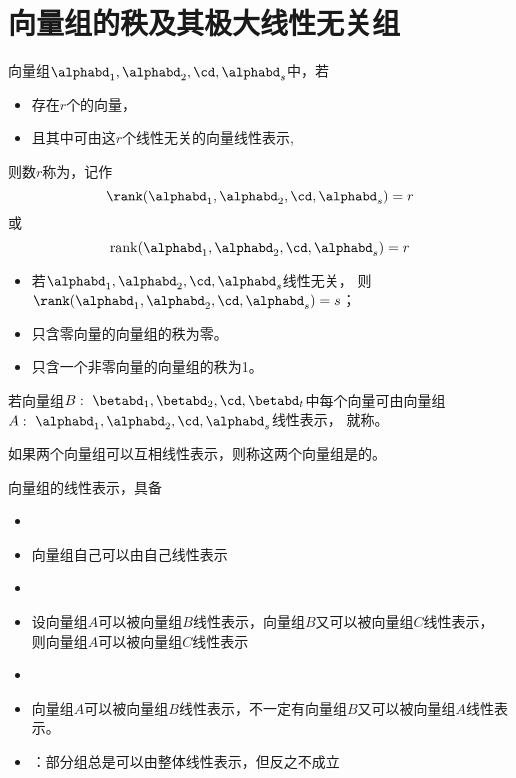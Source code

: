 \section{向量组的秩及其极大线性无关组}

\begin{dingyi}[向量组的秩]
  向量组$\alphabd_1,\alphabd_2,\cd,\alphabd_s$中，若
  \begin{itemize}
  \item 存在$r$个的向量，
  \item 且其中可由这$r$个线性无关的向量线性表示, 
  \end{itemize}
  则数$r$称为，记作
  $$
  \rank(\alphabd_1,\alphabd_2,\cd,\alphabd_s)=r
  $$
  或
  $$
  \mathrm{rank}(\alphabd_1,\alphabd_2,\cd,\alphabd_s)=r
  $$
  
\end{dingyi}

\begin{itemize}
\item 若$\alphabd_1,\alphabd_2,\cd,\alphabd_s$线性无关，
  则$\rank(\alphabd_1,\alphabd_2,\cd,\alphabd_s)=s$；
\item 只含零向量的向量组的秩为零。
\item 只含一个非零向量的向量组的秩为1。
\end{itemize}

\begin{dingyi}
  若向量组$B:~\betabd_1,\betabd_2,\cd,\betabd_t$中每个向量可由向量组$A:~\alphabd_1,\alphabd_2,\cd,\alphabd_s$线性表示，
  就称。 
  \vspace{0.1in}
  
  如果两个向量组可以互相线性表示，则称这两个向量组是的。
\end{dingyi}
 
向量组的线性表示，具备
\begin{itemize}
\item {}
\item[]向量组自己可以由自己线性表示  
\item {}
\item[] 设向量组$A$可以被向量组$B$线性表示，向量组$B$又可以被向量组$C$线性表示，
  则向量组$A$可以被向量组$C$线性表示  
\item {}
\item[] 向量组$A$可以被向量组$B$线性表示，不一定有向量组$B$又可以被向量组$A$线性表示。  
\item[] ：部分组总是可以由整体线性表示，但反之不成立
\end{itemize} 








